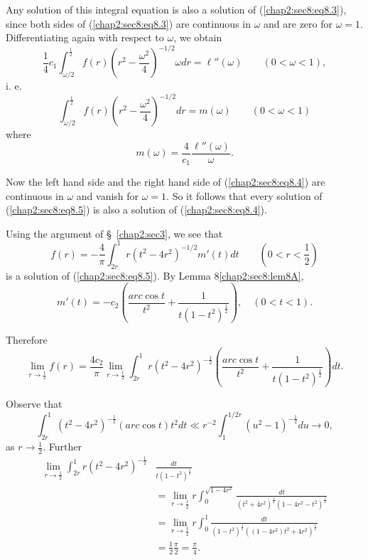 Any solution of this integral equation is also a solution of (\ref{chap2:sec8:eq8.3}), since both sides of (\ref{chap2:sec8:eq8.3}) are continuous in $\omega$ and are zero for $\omega = 1$. Differentiating again with respect to $\omega$, we obtain
\begin{equation*}
\frac{1}{4} c_{1} \int_{\omega/2}^{\frac{1}{2}} f(r) (r^{2} - \frac{\omega^{2}}{4})^{-1/2} \omega dr = \ell'' (\omega)\qquad (0 < \omega < 1),
\end{equation*}
i. e. 
\begin{equation*}
\int_{\omega/2}^{\frac{1}{2}} f(r) (r^{2} - \frac{\omega^{2}}{4})^{-1/2} dr = m(\omega) \qquad (0 < \omega < 1)\tag{8.5}\label{chap2:sec8:eq8.5}
\end{equation*}
where
$$
m(\omega) = \frac{4}{c_{1}} \frac{\ell'' (\omega)}{\omega}.
$$

Now the left hand side and the right hand side of (\ref{chap2:sec8:eq8.4}) are continuous in $\omega$ and vanish for $\omega = 1$. So it follows that every solution of (\ref{chap2:sec8:eq8.5}) is also a solution of (\ref{chap2:sec8:eq8.4}).

Using the argument of \S\ \ref{chap2:sec3}, we see that
\begin{equation*}
f(r) = -\frac{4}{\pi} \int_{2r}^{1} r(t^{2} - 4r^{2})^{-1/2} m'(t)dt \qquad \left(0 < r < \frac{1}{2}\right)
\end{equation*}\pageoriginale
is a solution of (\ref{chap2:sec8:eq8.5}). By Lemma 8\ref{chap2:sec8:lem8A}, 
\begin{equation*}
m'(t) = -c_{2} (\frac{arc \cos t}{t^{2}} + \frac{1}{t(1 - t^{2})^{\frac{1}{2}}}),\quad (0 < t < 1).
\end{equation*}

Therefore
\begin{equation*}
\lim_{r \to \frac{1}{2}} f(r) = \frac{4c_{2}}{\pi} \lim_{r \to \frac{1}{2}} \int_{2r}^{1} r(t^{2} - 4r^{2})^{-\frac{1}{2}} \left(\frac{arc \cos t}{t^{2}} + \frac{1}{t(1-t^{2})^{\frac{1}{2}}}\right) dt.
\end{equation*}

Observe that
\begin{equation*}
\int_{2r}^{1} (t^{2} - 4r^{2})^{-\frac{1}{2}} (arc \cos t) t^{2} dt \ll r^{-2} \int_{1}^{1/2r} (u^{2} - 1)^{-\frac{1}{2}} du \to 0,
\end{equation*}
as $r \to \frac{1}{2}$. Further
\begin{align*}
\lim_{r \to \frac{1}{2}} \int_{2r}^{1}  r(t^{2} - 4r^{2})^{-\frac{1}{2}} & \frac{dt}{t(1-t^{2})^{\frac{1}{2}}}\\ 
& = \lim_{r \to \frac{1}{2}} r \int_{0}^{\sqrt{1 - 4r^{2}}} \frac{dt}{(t^{2} + 4r^{2})^{\frac{1}{2}}(1 - 4r^{2}-t^{2})^{\frac{1}{2}}}\\
& = \lim_{r \to \frac{1}{2}} r \int_{0}^{1} \frac{dt}{(1 - t^{2})^{\frac{1}{2}} ((1 - 4r^{2})t^{2} + 4r^{2})^{\frac{1}{2}}}\\
& = \frac{1}{2} \frac{\pi}{2} = \frac{\pi}{4}.
\end{align*}

